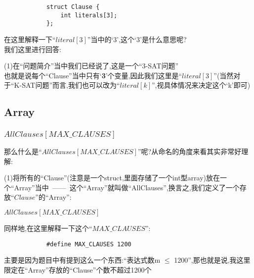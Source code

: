     \begin{lstlisting}
            struct Clause {
                int literals[3];
            };
    \end{lstlisting}

    \indent
    在这里解释一下``$literal[3]$''当中的`3',这个`3'是什么意思呢?\\
    我们这里进行回答:\par
        (1)在``问题简介''当中我们已经说了,这是一个``3-SAT问题''\\
    也就是说每个``Clause''当中只有`\textbf{3}'个变量,因此我们这里是``$literal[3]$''(当然对于``K-SAT问题''而言,我们也可以改为``$literal[k]$'',视具体情况来决定这个`k'即可)
    \subsection{Array}
        \subsubsection{$AllClauses[MAX\_CLAUSES]$}
            那么什么是``$AllClauses[MAX\_CLAUSES]$''呢?从命名的角度来看其实非常好理解:\par
            (1)将所有的``Clause''(注意是一个struct,里面存储了一个int型array)放在一个``Array''当中\ ——\ 这个``Array''就叫做``AllClauses'',换言之,我们定义了一个存放``$Clause$''的``Array'':
            \begin{center}
                $AllClauses[MAX\_CLAUSES]$\\  
            \end{center}
            \par
            同样地,在这里解释一下这个``$MAX\_CLAUSES$'':

    \begin{lstlisting}
            #define MAX_CLAUSES 1200
    \end{lstlisting}
    \par
    主要是因为题目中有提到这么一个东西:``表达式数m $\leq$ 1200'',那也就是说,我这里限定在``Array''存放的``Clause''个数不超过1200个

